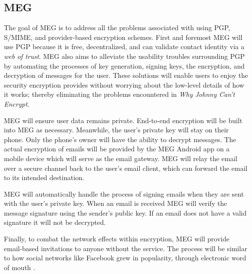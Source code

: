 \documentclass[10pt]{article}
\begin{document}
\begin{multicols}{2}
\subsection{MEG}
\par The goal of MEG is to address all the problems associated with using PGP, S/MIME, and provider-based encryption schemes. First and foremost MEG will use PGP because it is free, decentralized, and can validate contact identity via a \textit{web of trust}. MEG also aims to alleviate the usability troubles surrounding PGP by automating the processes of key generation, signing keys, the encryption, and decryption of messages for the user. These solutions will enable users to enjoy the security encryption provides without worrying about the low-level details of how it works; thereby eliminating the problems encountered in \textit{Why Johnny Can't Encrypt}\cite{whitten1999johnny}.
\par MEG will ensure user data remains private. End-to-end encryption will be built into MEG as necessary. Meanwhile, the user's private key will stay on their phone. Only the phone's owner will have the ability to decrypt messages. The actual encryption of emails will be provided by the MEG Android app on a mobile device which will serve as the email gateway. MEG will relay the email over a secure channel back to the user's email client, which can forward the email to its intended destination.
\par MEG will automatically handle the process of signing emails when they are sent with the user's private key. When an email is received MEG will verify the message signature using the sender's public key. If an email does not have a valid signature it will not be decrypted.
\par Finally, to combat the network effects within encryption, MEG will provide email-based invitations to anyone without the service. The process will be similar to how social networks like Facebook grew in popularity, through electronic word of mouth \cite{trusov2009effects}.


\end{multicols}
\end{document}
